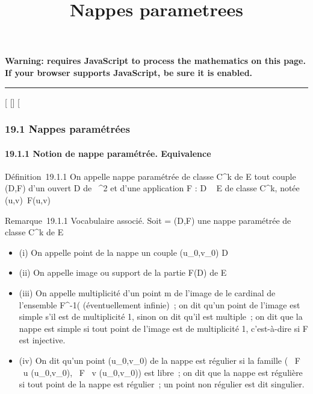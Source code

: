 \documentclass[]{article}
\title{Nappes parametrees}
\author{}
\date{}
\begin{document}
\maketitle

\textbf{Warning: 
requires JavaScript to process the mathematics on this page.\\ If your
browser supports JavaScript, be sure it is enabled.}

\begin{center}\rule{3in}{0.4pt}\end{center}

[
[]
[

\subsubsection{19.1 Nappes paramétrées}

\paragraph{19.1.1 Notion de nappe paramétrée. Equivalence}

Définition~19.1.1 On appelle nappe paramétrée de classe C^k
de E tout couple (D,F) d'un ouvert D de ~^2 et d'une
application F : D \rightarrow~ E de classe C^k, notée
(u,v)\mapsto~F(u,v)

Remarque~19.1.1 Vocabulaire associé. Soit \Sigma = (D,F) une nappe paramétrée
de classe C^k de E

\begin{itemize}
\itemsep1pt\parskip0pt
\item
  (i) On appelle point de la nappe \Sigma un couple
  (u_0,v_0) \in D
\item
  (ii) On appelle image ou support de \Sigma la partie F(D) de E
\item
  (iii) On appelle multiplicité d'un point m de l'image de \Sigma le cardinal
  de l'ensemble F^-1(\m\)
  (éventuellement infinie)~; on dit qu'un point de l'image est simple
  s'il est de multiplicité 1, sinon on dit qu'il est multiple~; on dit
  que la nappe est simple si tout point de l'image est de multiplicité
  1, c'est-à-dire si F est injective.
\item
  (iv) On dit qu'un point (u_0,v_0) de la nappe \Sigma est
  régulier si la famille ( \partial~F \over \partial~u
  (u_0,v_0), \partial~F \over \partial~v
  (u_0,v_0)) est libre~; on dit que la nappe est
  régulière si tout point de la nappe est régulier~; un point non
  régulier est dit singulier.
\end{itemize}
\end{document}
